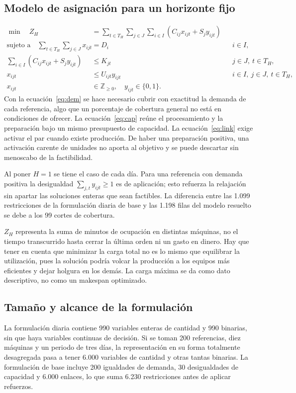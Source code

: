 \documentclass[12pt,a4paper,oneside]{article}
\begin{document}
\subsection{Modelo de asignación para un horizonte fijo}
\begin{align}
\min\quad Z_H &=\sum_{t\in T_H}\sum_{j\in J}\sum_{i\in I}(C_{ij}x_{ijt}+S_jy_{ijt}) \label{eq:obj}\\
\text{sujeto a}\quad
\sum_{t\in T_H}\sum_{j\in J}x_{ijt}&=D_i && i\in I, \label{eq:dem}\\
\sum_{i\in I}(C_{ij}x_{ijt}+S_jy_{ijt})&\leq K_{jt} &&j\in J,\ t\in T_H, \label{eq:cap}\\
x_{ijt}&\leq U_{ijt}y_{ijt} &&i\in I,\ j\in J,\ t\in T_H, \label{eq:link}\\
x_{ijt}&\in\mathbb Z_{\geq0},\quad y_{ijt}\in\{0,1\}.\label{eq:dom}
\end{align}
Con la ecuación~\eqref{eq:dem} se hace necesario cubrir con exactitud la demanda de cada referencia, algo que un porcentaje de cobertura general no está en condiciones de ofrecer. La ecuación~\eqref{eq:cap} reúne el procesamiento y la preparación bajo un mismo presupuesto de capacidad. La ecuación~\eqref{eq:link} exige activar el par cuando existe producción. De haber una preparación positiva, una activación carente de unidades no aporta al objetivo y se puede descartar sin menoscabo de la factibilidad.

Al poner $H=1$ se tiene el caso de cada día. Para una referencia con demanda positiva la desigualdad $\sum_{j,t}y_{ijt}\geq1$ es de aplicación; esto refuerza la relajación sin apartar las soluciones enteras que sean factibles. La diferencia entre las 1.099 restricciones de la formulación diaria de base y las 1.198 filas del modelo resuelto se debe a los 99 cortes de cobertura.

$Z_H$ representa la suma de minutos de ocupación en distintas máquinas, no el tiempo transcurrido hasta cerrar la última orden ni un gasto en dinero. Hay que tener en cuenta que minimizar la carga total no es lo mismo que equilibrar la utilización, pues la solución podría volcar la producción a los equipos más eficientes y dejar holgura en los demás. La carga máxima se da como dato descriptivo, no como un makespan optimizado.

\subsection{Tamaño y alcance de la formulación}
La formulación diaria contiene 990 variables enteras de cantidad y 990 binarias, sin que haya variables continuas de decisión. Si se toman 200 referencias, diez máquinas y un periodo de tres días, la representación en su forma totalmente desagregada pasa a tener 6.000 variables de cantidad y otras tantas binarias. La formulación de base incluye 200 igualdades de demanda, 30 desigualdades de capacidad y 6.000 enlaces, lo que suma 6.230 restricciones antes de aplicar refuerzos.
\end{document}
